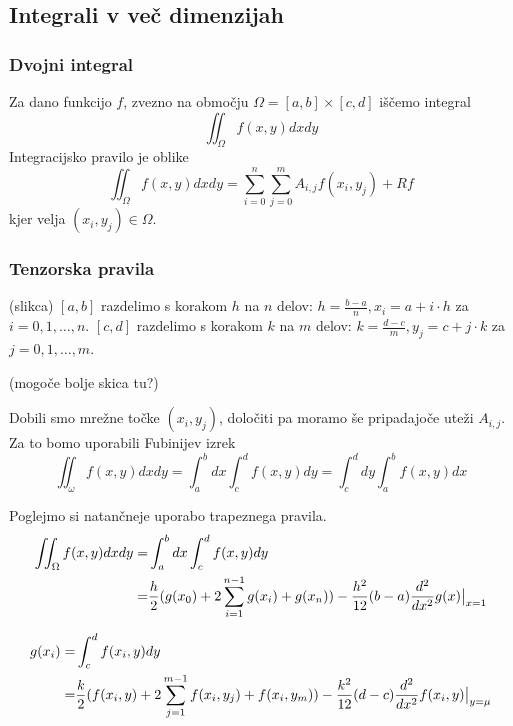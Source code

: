\documentclass[a4paper,12pt]{article}
\theoremstyle{definition}
\theoremstyle{remark}
\newcommand\restr[2]{{%
  \left.\kern-\nulldelimiterspace %
  #1 %
  \littletaller %
  \right|_{#2} %
  }}
\newcommand{\littletaller}{\mathchoice{\vphantom{\big|}}{}{}{}}
\begin{document}
\subsection{Integrali v več dimenzijah}
\subsubsection{Dvojni integral}
Za dano funkcijo $f$, zvezno na območju $\Omega = [a, b] \times [c, d]$ iščemo integral
\begin{equation*}
    \iint_{\Omega} f(x, y) dx dy
\end{equation*}
Integracijsko pravilo je oblike
\begin{equation*}
    \iint_{\Omega} f(x, y) dx dy = \sum_{i=0}^{n} \sum_{j = 0}^{m} A_{i, j} f(x_i, y_j) + Rf
\end{equation*}
kjer velja $(x_i, y_j) \in \Omega$.

\subsubsection{Tenzorska pravila}
(slikca)
$[a, b]$ razdelimo s korakom $h$ na $n$ delov: $h = \frac{b-a}{n}, x_i = a + i \cdot h$ za $i = 0, 1, \dots, n$.
$[c, d]$ razdelimo s korakom $k$ na $m$ delov: $k = \frac{d-c}{m}, y_j = c + j \cdot k$ za $j = 0, 1, \dots, m$.

(mogoče bolje skica tu?)

Dobili smo mrežne točke $(x_i, y_j)$, določiti pa moramo še pripadajoče uteži $A_{i, j}$. Za to bomo uporabili Fubinijev izrek
\begin{equation*}
    \iint_{\omega} f(x, y) dx dy = \int_{a}^{b} dx \int_{c}^{d} f(x, y) dy = \int_{c}^{d} dy \int_{a}^{b} f(x, y) dx
\end{equation*}

Poglejmo si natančneje uporabo trapeznega pravila.
\begin{align*}
    \iint_{\Omega} f(x, y) dx dy =& \int_{a}^{b} dx \int_{c}^{d} f(x, y) dy \\
                                 =& \frac{h}{2} (g(x_0) + 2 \sum_{i=1}^{n-1} g(x_i) + g(x_n)) - \frac{h^2}{12} (b-a) \frac{d^2}{dx^2} g(x) \restr{}{x=1}
\end{align*}

\begin{align*}
    g(x_i) =& \int_{c}^{d} f(x_i, y) dy \\
           =& \frac{k}{2} (f(x_i,y) + 2 \sum_{j=1}^{m-1} f(x_i, y_j) + f(x_i, y_m)) - \frac{k^2}{12}(d-c) \frac{d^2}{dx^2} f(x_i, y) \restr{}{y=\mu}
\end{align*}
\end{document}
